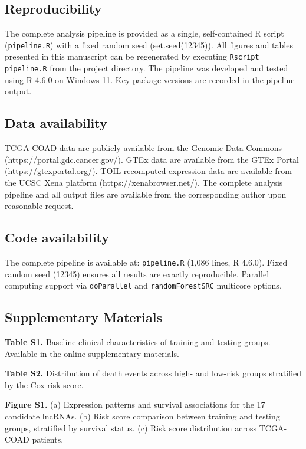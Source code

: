 \documentclass[fleqn,10pt]{wlscirep}
\begin{document}
\subsection*{Reproducibility}

The complete analysis pipeline is provided as a single, self-contained R script (\texttt{pipeline.R}) with a fixed random seed (set.seed(12345)). All figures and tables presented in this manuscript can be regenerated by executing \texttt{Rscript pipeline.R} from the project directory. The pipeline was developed and tested using R 4.6.0 on Windows 11. Key package versions are recorded in the pipeline output.

\subsection*{Data availability}

TCGA-COAD data are publicly available from the Genomic Data Commons (https://portal.gdc.cancer.gov/). GTEx data are available from the GTEx Portal (https://gtexportal.org/). TOIL-recomputed expression data are available from the UCSC Xena platform (https://xenabrowser.net/). The complete analysis pipeline and all output files are available from the corresponding author upon reasonable request.

\subsection*{Code availability}

The complete pipeline is available at: \texttt{pipeline.R} (1,086 lines, R 4.6.0). Fixed random seed (12345) ensures all results are exactly reproducible. Parallel computing support via \texttt{doParallel} and \texttt{randomForestSRC} multicore options.

\subsection*{Supplementary Materials}

\textbf{Table S1.} Baseline clinical characteristics of training and testing groups. Available in the online supplementary materials.

\textbf{Table S2.} Distribution of death events across high- and low-risk groups stratified by the Cox risk score.

\textbf{Figure S1.} (a) Expression patterns and survival associations for the 17 candidate lncRNAs. (b) Risk score comparison between training and testing groups, stratified by survival status. (c) Risk score distribution across TCGA-COAD patients.
\end{document}

